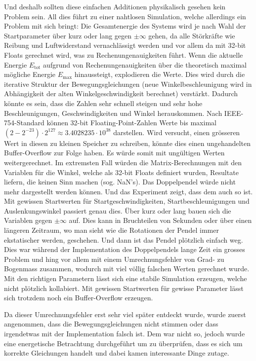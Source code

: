 \documentclass[titlepage, 11pt, a4paper, ngerman]{article}
\begin{document}
Und deshalb sollten diese einfachen Additionen physikalisch gesehen kein Problem sein. All dies führt zu einer nahtlosen Simulation, welche allerdings ein Problem mit sich bringt: Die Gesamtenergie des Systems wird je nach Wahl der Startparameter über kurz oder lang gegen $\pm\infty$ gehen, da alle Störkräfte wie Reibung und Luftwiderstand vernachlässigt werden und vor allem da mit 32-bit \glspl{Float} gerechnet wird, was zu Rechenungenauigkeiten führt. Wenn die aktuelle Energie $E_{\text{tot}}$ aufgrund von Rechenungenauigkeiten über die theoretisch maximal mögliche Energie $E_{\text{max}}$ hinaussteigt, explodieren die Werte. Dies wird durch die iterative Struktur der Bewegungsgleichungen (neue Winkelbeschleunigung wird in Abhängigkeit der alten Winkelgeschwindigkeit berechnet) verstärkt. Dadurch könnte es sein, dass die Zahlen sehr schnell steigen und sehr hohe Beschleunigungen, Geschwindigkeiten und Winkel herauskommen. Nach IEEE-754-Standard können 32-bit \gls{Floating-Point}-Zahlen Werte bis maximal $(2 - 2^{-23}) \cdot 2^{127} \approx 3.4028235 \cdot 10^{38}$ darstellen. Wird versucht, einen grösseren Wert in diesen zu kleinen Speicher zu schreiben, könnte dies einen ungehandelten Buffer-Overflow zur Folge haben. Es würde somit mit ungültigen Werten weitergerechnet. Im extremsten Fall würden die Matrix-Berechnungen mit den Variablen für die Winkel, welche als 32-bit \glspl{Float} definiert wurden, Resultate liefern, die keinen Sinn machen (sog. \acrshort{NaN}'s). Das Doppelpendel würde nicht mehr dargestellt werden können. Und das Experiment zeigt, dass dem auch so ist. Mit gewissen Startwerten für Startgeschwindigkeiten, Startbeschleunigungen und Auslenkungswinkel passiert genau dies. Über kurz oder lang bauen sich die Variablen gegen $\pm\infty$ auf. Dies kann in Bruchteilen von Sekunden oder über einen längeren Zeitraum, wo man sieht wie die Rotationen der Pendel immer ekstatischer werden, geschehen. Und dann ist das Pendel plötzlich einfach weg. Dies war während der Implementation des Doppelpendels lange Zeit ein grosses Problem und hing vor allem mit einem Umrechnungsfehler von Grad- zu Bogenmass zusammen, wodurch mit viel völlig falschen Werten gerechnet wurde. Mit den richtigen Parametern lässt sich eine stabile Simulation erzeugen, welche nicht plötzlich kollabiert. Mit gewissen Startwerten für gewisse Parameter lässt sich trotzdem noch ein Buffer-Overflow erzeugen.\par
Da dieser Umrechnungsfehler erst sehr viel später entdeckt wurde, wurde zuerst angenommen, dass die Bewegungsgleichungen nicht stimmen oder dass irgendetwas mit der Implementation falsch ist. Dem war nicht so, jedoch wurde eine energetische Betrachtung durchgeführt um zu überprüfen, dass es sich um korrekte Gleichungen handelt und dabei kamen interessante Dinge zutage. 
\end{document}
